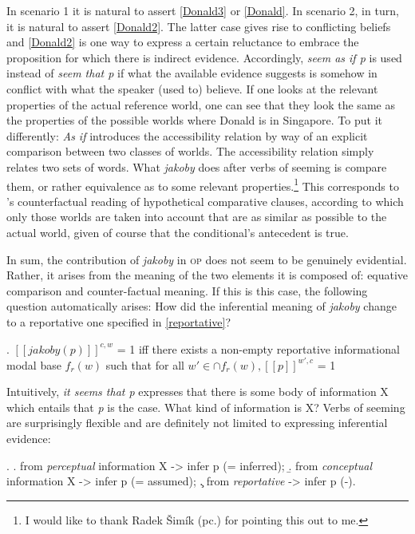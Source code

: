 \documentclass[output=paper
,modfonts
,nonflat]{langsci/langscibook}
\begin{document}
\noindent In scenario 1 it is natural to assert \ref{Donald3} or \ref{Donald}. In scenario 2, in turn, it is natural to assert \ref{Donald2}. The latter case gives rise to conflicting beliefs and  \ref{Donald2} is one way to express a certain reluctance to embrace the proposition for which there is indirect evidence. Accordingly, \emph{seem as if p} is used instead of \emph{seem that p} if what the available evidence suggests is somehow in conflict with what the speaker (used to) believe. If one looks at the relevant properties of the actual reference world, one can see that they look the same as the properties of the possible worlds where Donald is in Singapore. To put it differently: \emph{As if} introduces the accessibility relation by way of an explicit comparison between two classes of worlds. The accessibility  relation simply relates two sets of words. What \emph{jakoby} does after verbs of seeming is compare them, or rather equivalence as to some relevant properties.\footnote{I would like to thank Radek Šimík (pc.) for pointing this out to me.
} 
This corresponds to \textcite[988]{Bucking2017}'s counterfactual reading of hypothetical comparative clauses, according to which only those worlds are taken into account that are as similar as possible to the actual world, given of course that the conditional's antecedent is true.   

In sum, the contribution of \emph{jakoby} in \textsc{op} does not seem to be genuinely evidential. Rather, it arises from the meaning of the two elements it is composed of: equative comparison and counter-factual meaning. If this is this case, the following question automatically arises: How did the inferential meaning of \emph{jakoby} change to a reportative one specified in \ref{reportative}? 

\ex.	\([\![jakoby(p)]\!]^{c,w}\) = 1 iff there exists a non-empty reportative informational modal base \( f_{r}(w) \) such that for all \( w' \in \cap f_{r}(w), [[p]]^{w',c}\) = 1 \label{reportative}

\noindent Intuitively, \emph{it seems that p} expresses that there is some body of information X which entails that \emph{p} is the case. What kind of information is X? Verbs of seeming are surprisingly flexible and are definitely not limited to expressing inferential evidence:

\ex.	\a.	from \emph{perceptual} information X -> infer p (= inferred);
	\b.	 from \emph{conceptual} information X -> infer p (= assumed);
	\c.	 from \emph{reportative} -> infer p (-).
\end{document}
